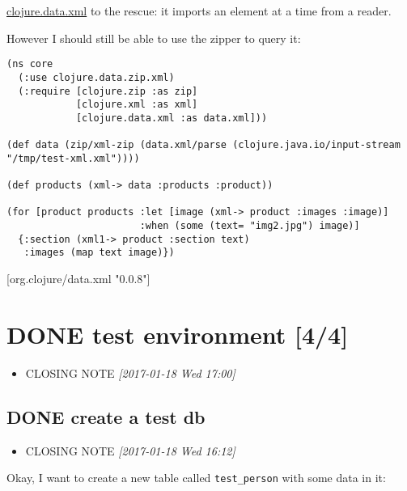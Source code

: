 \documentclass[11pt]{article}
\begin{document}
\href{https://github.com/clojure/data.xml}{clojure.data.xml} to the rescue: it imports an element at a time from a
reader.

However I should still be able to use the zipper to query it:

\begin{verbatim}
(ns core
  (:use clojure.data.zip.xml)
  (:require [clojure.zip :as zip]
            [clojure.xml :as xml]
            [clojure.data.xml :as data.xml]))

(def data (zip/xml-zip (data.xml/parse (clojure.java.io/input-stream "/tmp/test-xml.xml"))))

(def products (xml-> data :products :product))

(for [product products :let [image (xml-> product :images :image)]
                       :when (some (text= "img2.jpg") image)]
  {:section (xml1-> product :section text)
   :images (map text image)})
\end{verbatim}

[org.clojure/data.xml "0.0.8"]
\section{{\bfseries\sffamily DONE} test environment [4/4]}
\label{sec:org831d32b}
\begin{itemize}
\item CLOSING NOTE \textit{[2017-01-18 Wed 17:00]}
\end{itemize}
\subsection{{\bfseries\sffamily DONE} create a test db}
\label{sec:org220f942}
\begin{itemize}
\item CLOSING NOTE \textit{[2017-01-18 Wed 16:12]}
\end{itemize}
Okay, I want to create a new table called \texttt{test\_person} with some data
in it:
\end{document}
